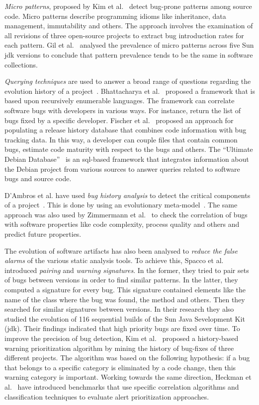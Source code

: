 \documentclass[conference]{llncs}
\begin{document}
{\it Micro patterns}, proposed by Kim et al.~\cite{KPW06}
detect bug-prone patterns among source code. Micro patterns describe programming
idioms like inheritance, data management, immutability and others. The approach
involves the examination of all revisions of three open-source projects to extract bug
introduction rates for each pattern. Gil et al.~\cite{GM05} analysed the
prevalence of micro patterns across five Sun {\sc jdk} versions to conclude that
pattern prevalence tends to be the same in software collections.

{\it Querying techniques} are used to answer a broad range of questions
regarding the evolution history of a project~\cite{HG05}. Bhattacharya et
al.~\cite{BN11}\cite{B11} proposed a framework that is based upon
recursively enumerable languages. The framework can correlate software
bugs with developers in various ways. For instance, return the list of
bugs fixed by a specific developer. Fischer et al.~\cite{FPG03} proposed
an approach for populating a release history database that combines code
information with bug tracking data. In this way, a developer can couple files
that contain common bugs, estimate code maturity with respect to the bugs
and others. The ``Ultimate Debian Database''~\cite{NZ10} is an {\sc sql}-based
framework that integrates information about the Debian project from various
sources to answer queries related to software bugs and source code.

D'Ambros et al. have used {\it bug history analysis} to detect
the critical components of a project~\cite{D08}. This is done by using an
evolutionary meta-model~\cite{DL08}. The same approach was
also used by Zimmermann et al.~\cite{ZNA08} to check the correlation
of bugs with software properties like code complexity, process quality and others
and predict future properties.

The evolution of software artifacts has also been analysed to {\it reduce the false
alarms} of the various static analysis tools. To achieve this, Spacco et
al.~\cite{SHP06} introduced {\it pairing} and {\it warning signatures}. In the
former, they tried to pair sets of bugs between versions in order to find
similar patterns. In the latter, they computed a signature for every bug. This
signature contained elements like the name of the class where the bug was found,
the method and others. Then they searched for similar signatures between
versions. In their research they also studied the evolution of 116 sequential
builds of the Sun Java Sevelopment Kit ({\sc jdk}). Their findings indicated that
high priority bugs are fixed over time. To improve the precision of bug
detection, Kim et al.~\cite{KE07b}\cite{KE07} proposed a history-based warning
prioritization algorithm by mining the history of bug-fixes of three
different projects. The algorithm was based on the following hypothesis: if a
bug that belongs to a specific category is eliminated by a code change, then
this warning category is important. Working towards the same direction, Heckman
et al.~\cite{HW09}\cite{HW08} have introduced benchmarks that use specific
correlation algorithms and classification techniques to evaluate alert
prioritization approaches.
\end{document}
